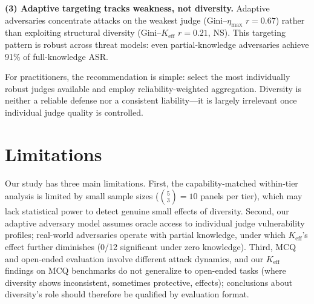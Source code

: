 \documentclass[11pt,a4paper]{article}
\begin{document}
\textbf{(3) Adaptive targeting tracks weakness, not diversity.}
Adaptive adversaries concentrate attacks on the weakest judge (Gini--$\eta_{\max}$ $r = 0.67$) rather than exploiting structural diversity (Gini--$K_{\mathrm{eff}}$ $r = 0.21$, NS).
This targeting pattern is robust across threat models: even partial-knowledge adversaries achieve 91\% of full-knowledge ASR.

For practitioners, the recommendation is simple: select the most individually robust judges available and employ reliability-weighted aggregation.
Diversity is neither a reliable defense nor a consistent liability---it is largely irrelevant once individual judge quality is controlled.

\section*{Limitations}
\label{sec:limitations}

Our study has three main limitations.
First, the capability-matched within-tier analysis is limited by small sample sizes ($\binom{5}{3} = 10$ panels per tier), which may lack statistical power to detect genuine small effects of diversity.
Second, our adaptive adversary model assumes oracle access to individual judge vulnerability profiles; real-world adversaries operate with partial knowledge, under which $K_{\mathrm{eff}}$'s effect further diminishes (0/12 significant under zero knowledge).
Third, MCQ and open-ended evaluation involve different attack dynamics, and our $K_{\mathrm{eff}}$ findings on MCQ benchmarks do not generalize to open-ended tasks (where diversity shows inconsistent, sometimes protective, effects); conclusions about diversity's role should therefore be qualified by evaluation format.
\end{document}
